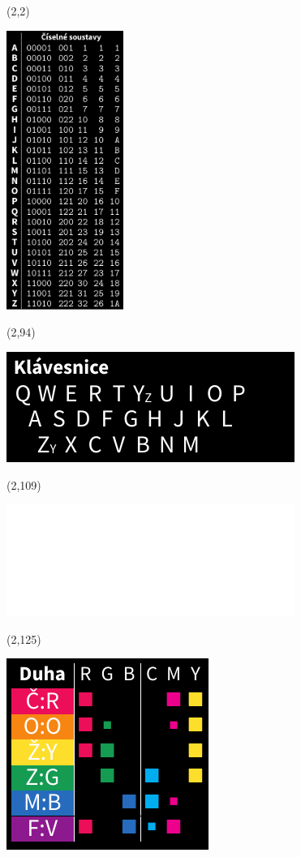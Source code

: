 \documentclass{extarticle}
\begin{document}
\pagecolor{black}
\pagestyle{empty}

\begin{textblock}{38}(2,2)
\vfill
{\centerline{\includegraphics[width=38mm]{tools/numbers-table-v2.pdf}}} 
\vfill
\end{textblock}


\begin{textblock}{38}(2,94)
\vfill
{\centerline{\includegraphics[scale=0.6333]{tools/keyboard-v2.pdf}}} 
\vfill
\end{textblock}

\begin{textblock}{38}(2,109)
\vfill
{\centerline{\includegraphics[scale=0.6333]{tools/rosicrucian-polish-v2.pdf}}} 
\vfill
\end{textblock}

\begin{textblock}{26.6}(2,125)
\vfill
{\centerline{\includegraphics[scale=0.6333]{tools/rainbow-v2.pdf}}} 
\vfill
\end{textblock}
\end{document}
